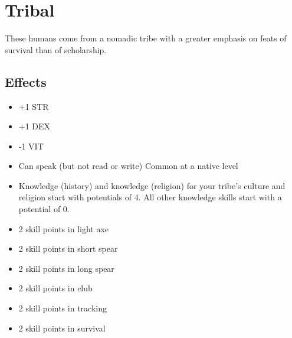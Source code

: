 \section{Tribal}\label{culture:tribal}
These humans come from a nomadic tribe with a greater emphasis on feats of
survival than of scholarship.

\subsection{Effects}
\begin{itemize}
    \item +1 STR
    \item +1 DEX
    \item -1 VIT
    \item Can speak (but not read or write) Common at a native level
    \item Knowledge (history) and knowledge (religion) for your tribe's culture
        and religion start with potentials of 4. All other knowledge skills
        start with a potential of 0.
    \item 2 skill points in light axe
    \item 2 skill points in short spear
    \item 2 skill points in long spear
    \item 2 skill points in club
    \item 2 skill points in tracking
    \item 2 skill points in survival
\end{itemize}
